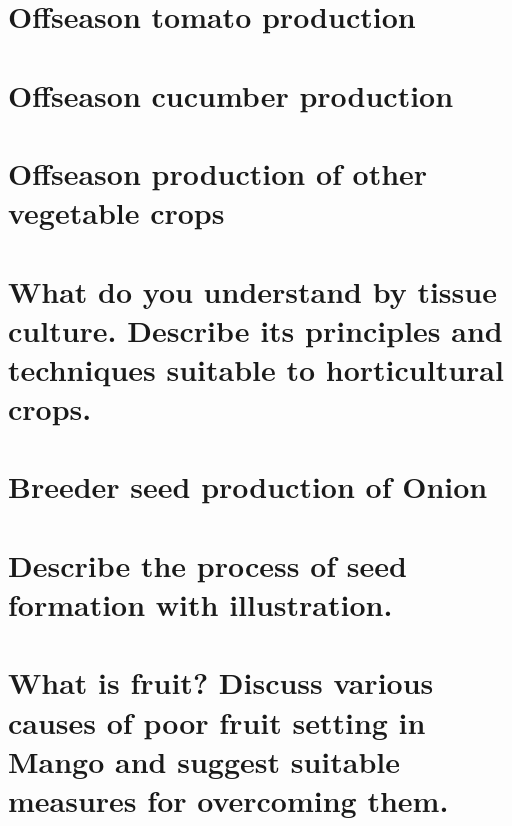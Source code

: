 \documentclass[
  openany]{book}
\begin{document}
\hypertarget{offseason-tomato-production}{%
\section{Offseason tomato production}\label{offseason-tomato-production}}

\hypertarget{offseason-cucumber-production}{%
\section{Offseason cucumber production}\label{offseason-cucumber-production}}

\hypertarget{offseason-production-of-other-vegetable-crops}{%
\section{Offseason production of other vegetable crops}\label{offseason-production-of-other-vegetable-crops}}

\hypertarget{what-do-you-understand-by-tissue-culture.-describe-its-principles-and-techniques-suitable-to-horticultural-crops.}{%
\section{What do you understand by tissue culture. Describe its principles and techniques suitable to horticultural crops.}\label{what-do-you-understand-by-tissue-culture.-describe-its-principles-and-techniques-suitable-to-horticultural-crops.}}

\hypertarget{breeder-seed-production-of-onion}{%
\section{Breeder seed production of Onion}\label{breeder-seed-production-of-onion}}

\hypertarget{describe-the-process-of-seed-formation-with-illustration.}{%
\section{Describe the process of seed formation with illustration.}\label{describe-the-process-of-seed-formation-with-illustration.}}

\hypertarget{what-is-fruit-discuss-various-causes-of-poor-fruit-setting-in-mango-and-suggest-suitable-measures-for-overcoming-them.}{%
\section{What is fruit? Discuss various causes of poor fruit setting in Mango and suggest suitable measures for overcoming them.}\label{what-is-fruit-discuss-various-causes-of-poor-fruit-setting-in-mango-and-suggest-suitable-measures-for-overcoming-them.}}
\end{document}
